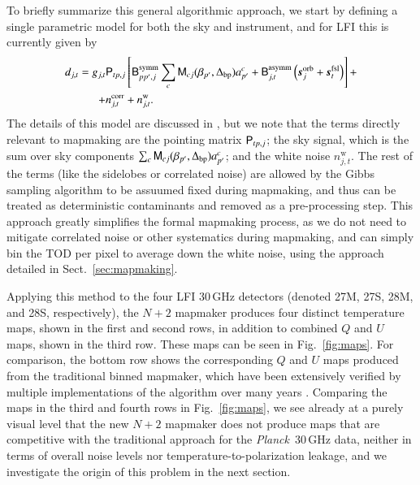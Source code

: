 \documentclass{aa}
\def\Planck{\textit{Planck}}
\begin{document}
To briefly summarize this general algorithmic approach, we start by defining a single parametric model for both the sky and instrument, and for LFI this is currently given by
\begin{equation}
  \begin{split}
    d_{j,t} = g_{j,t}&\mathsf{P}_{tp,j}\left[\mathsf{B}^{\mathrm{symm}}_{pp',j}\sum_{c}
      \mathsf{M}_{cj}(\beta_{p'}, \Delta_{\mathrm{bp}})a^c_{p'}  + \mathsf{B}^{\mathrm{asymm}}_{j,t}\left(\boldsymbol{s}^{\mathrm{orb}}_{j}  
      + \boldsymbol{s}^{\mathrm{fsl}}_{t}\right)\right] + \\
    + &n^{\mathrm{corr}}_{j,t} + n^{\mathrm{w}}_{j,t}.
  \end{split}
  \label{eq:todmodel}
\end{equation}
The details of this model are discussed in \citep{bp01}, but we note that the terms directly relevant to mapmaking are the pointing matrix $\mathsf{P}_{tp,j}$; the sky signal, which is the sum over sky components $\sum_{c} \mathsf{M}_{cj}(\beta_{p'}, \Delta_{\mathrm{bp}})a^c_{p'}$; and the white noise $n^{\mathrm{w}}_{j,t}$. The rest of the terms (like the sidelobes or correlated noise) are allowed by the Gibbs sampling algorithm \citep{gibbs} to be assuumed fixed during mapmaking, and thus can be treated as deterministic contaminants and removed as a pre-processing step. This approach greatly simplifies the formal mapmaking process, as we do not need to mitigate correlated noise or other systematics during mapmaking, and can simply bin the TOD per pixel to average down the white noise, using the approach detailed in Sect.~\ref{sec:mapmaking}.

Applying this method to the four LFI 30\,GHz detectors (denoted 27M, 27S, 28M, and 28S, respectively), the $N+2$ mapmaker produces four distinct temperature maps, shown in the first and second rows, in addition to combined $Q$ and $U$ maps, shown in the third row. These maps can be seen in Fig.~\ref{fig:maps}. For comparison, the bottom row shows the corresponding $Q$ and $U$ maps produced from the traditional binned mapmaker, which have been extensively verified by multiple implementations of the algorithm over many years \citep[e.g.,][]{lfi2013,lfi2015,lfi2018}. Comparing the maps in the third and fourth rows in Fig.~\ref{fig:maps}, we see already at a purely visual level that the new $N+2$ mapmaker does not produce maps that are competitive with the traditional approach for the \Planck\ 30\,GHz data, neither in terms of overall noise levels nor temperature-to-polarization leakage, and we investigate the origin of this problem in the next section.
\end{document}

